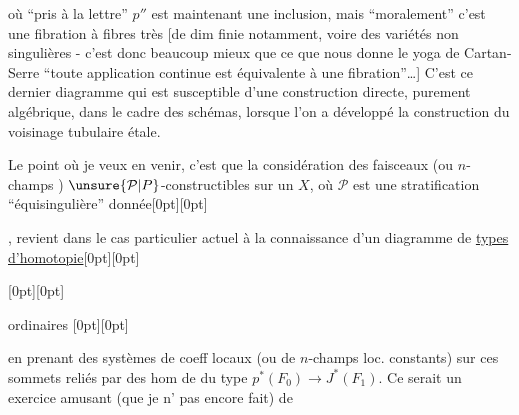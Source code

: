 %
où ``pris à la lettre'' $p''$ est maintenant une inclusion, mais ``moralement'' c'est  une fibration à fibres très  [de dim finie notamment, voire des variétés non singulières - c'est donc beaucoup mieux que ce que nous donne le yoga de Cartan-Serre ``toute application continue est équivalente à une fibration''\ldots] C'est ce dernier diagramme qui est susceptible d'une construction directe, purement algébrique, dans le cadre des schémas, lorsque l'on a développé la construction du voisinage tubulaire étale.

Le point où je veux en venir, c'est que la considération  des faisceaux (ou  $n$-champs ) $\unsure{\mathcal P|P}$-constructibles sur un $X$, où $\mathcal P$ est une stratification ``équisingulière'' donnée\raisebox{0pt}[0pt][0pt]{\parbox{0pt}{}}, revient dans le cas particulier actuel à la connaissance d'un diagramme de \uline{types d'homotopie}\raisebox{0pt}[0pt][0pt]{\parbox{0pt}{}} \raisebox{0pt}[0pt][0pt]{\parbox{0pt}{}} ordinaires
\raisebox{0pt}[0pt][0pt]{\parbox{0pt}{}}en prenant des systèmes de coeff locaux (ou de $n$-champs loc. constants) sur ces sommets  reliés par des hom de  du type $p^*(F_0)\to J^*(F_1)$. Ce serait un exercice amusant (que je n' pas encore fait) de

